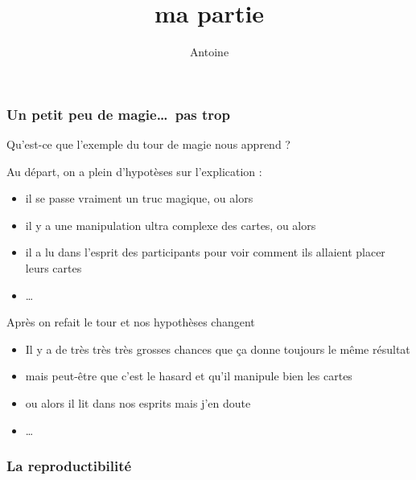 \documentclass{beamer}
\title{ma partie}
\author{Antoine}
\date{}
\institute[]{%
  Faculté des Sciences\\
  Université de Mons
  \\[1cm]
  \texttt{[image: UMONS]}\hspace{2em}%
  \raisebox{-1ex}{\texttt{[image: UMONS\_FS]}}
  \\
  \vspace{2ex}
}
\begin{document}
\begin{frame}[plain]
    \titlepage
\end{frame}

\begin{frame}[plain]
    \frametitle{Un petit peu de magie\dots~pas trop}

   Qu'est-ce que l'exemple du tour de magie nous apprend ? 

   Au départ, on a plein d'hypotèses sur l'explication :

   \begin{itemize}
       \item il se passe vraiment un truc magique, ou alors
       \item il y a une manipulation ultra complexe des cartes, ou alors
       \item il a lu dans l'esprit des participants pour voir comment ils allaient placer leurs cartes
       \item \dots
   \end{itemize}

   \pause

   Après on refait le tour et nos hypothèses changent

   \begin{itemize}
       \item Il y a de très très très grosses chances que ça donne toujours le même résultat
       \item mais peut-être que c'est le hasard et qu'il manipule bien les cartes
       \item ou alors il lit dans nos esprits mais j'en doute
       \item \dots
   \end{itemize}

   

\end{frame}

\begin{frame}[plain]
    \frametitle{La reproductibilité}


\vspace{1cm}


\vspace{1cm}


\end{frame}
\end{document}
